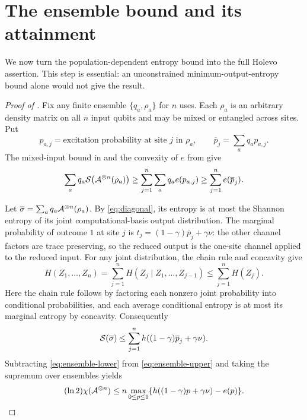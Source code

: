 \section{The ensemble bound and its attainment}\label{sec:holevo}

We now turn the population-dependent entropy bound into the full
Holevo assertion. This step is essential: an unconstrained
minimum-output-entropy bound alone would not give the result.

\begin{proof}[Proof of ]
Fix any finite ensemble $\{q_a,\rho_a\}$ for $n$ uses. Each $\rho_a$
is an arbitrary density matrix on all $n$ input qubits and may be
mixed or entangled across sites. Put
\[
 p_{a,j}=\text{excitation probability at site $j$ in $\rho_a$},
 \qquad \overline p_j=\sum_aq_ap_{a,j}.
\]
The mixed-input bound in  and the convexity of
$e$ from  give
\begin{equation}\label{eq:ensemble-lower}
 \sum_aq_a\mathcal S\bigl(\mathcal A^{\otimes n}(\rho_a)\bigr)
 \ge\sum_{j=1}^n\sum_aq_ae(p_{a,j})
 \ge\sum_{j=1}^ne(\overline p_j).
\end{equation}

Let $\overline\sigma=\sum_aq_a\mathcal A^{\otimes n}(\rho_a)$.
By \eqref{eq:diagonal}, its entropy is at most the Shannon entropy
of its joint computational-basis output distribution. The marginal
probability of outcome $1$ at site $j$ is
$t_j=(1-\gamma)\overline p_j+\gamma\nu$: the other channel factors
are trace preserving, so the reduced output is the one-site channel
applied to the reduced input. For any joint distribution, the chain
rule and concavity give
\[
 H(Z_1,\ldots,Z_n)
 =\sum_{j=1}^nH(Z_j\mid Z_1,\ldots,Z_{j-1})
 \le\sum_{j=1}^nH(Z_j).
\]
Here the chain rule follows by factoring each nonzero joint
probability into conditional probabilities, and each average
conditional entropy is at most its marginal entropy by concavity.
Consequently
\begin{equation}\label{eq:ensemble-upper}
 \mathcal S(\overline\sigma)\le
 \sum_{j=1}^nh((1-\gamma)\overline p_j+\gamma\nu).
\end{equation}
Subtracting \eqref{eq:ensemble-lower} from
\eqref{eq:ensemble-upper} and taking the supremum over ensembles yields
\begin{equation}\label{eq:holevo-upper}
 (\ln2)\chi(\mathcal A^{\otimes n})
 \le n\max_{0\le p\le1}
       \{h((1-\gamma)p+\gamma\nu)-e(p)\}.
\end{equation}


\end{proof}
